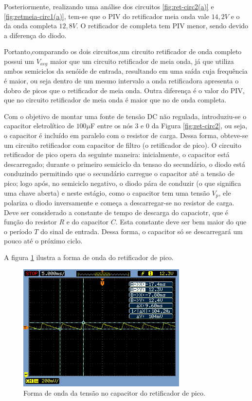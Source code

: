 \documentclass[a4paper]{article} %
\begin{document}
Posteriormente, realizando uma análise dos circuitos  \ref{fig:ret-circ2(a)} e \ref{fig:retmeia-circ1(a)}, tem-se que o PIV do retificador meia onda vale $14,2V$ e o da onda completa $12,8V$. O retificador de completa tem PIV menor, sendo devido a diferença do diodo.


\newpage
Portanto,comparando os dois circuitos,um circuito retificador de onda completo possui um $V_{avg}$ maior que um circuito retificador de meia onda, já que utiliza ambos semiciclos da senóide de entrada, resultando em uma saída cuja frequência é maior, ou seja dentro de um mesmo intervalo a onda retificadora apresenta o dobro de picos que o retificador de meia onda. Outra diferença é o valor do PIV, que no circuito retificador de meia onda é maior que no de onda completa. 


    Com o objetivo de montar uma fonte de tensão DC não regulada, introduziu-se o capacitor eletrolítico de  $100\mu$F entre os nós 3 e 0 da Figura \ref{fig:ret-circ2}, ou seja, o capacitor é incluído em paralelo com o resistor de carga. Dessa forma, obteve-se um circuito retificador com capacitor de filtro (o retificador de pico).
         O circuito retificador de pico opera da seguinte maneira: inicialmente, o capacitor está descarregado; durante o primeiro semiciclo da tensao do secundário, o diodo está conduzindo permitindo que o secundário carregue o capacitor até a tensão de pico; logo após, no semiciclo negativo, o diodo pára de conduzir (o que significa uma chave aberta) e neste estágio, como o capacitor tem uma tensão $V_p$, ele polariza o diodo inversamente e começa a descarregar-se no resistor de carga. Deve ser considerado a constante de tempo de descarga do capaciotr, que é função do resistor $R$ e do capacitor $C$. Esta constante deve ser bem maior do que o período $T$ do sinal de entrada. Dessa forma, o capacitor só se descarregará um pouco até o próximo ciclo.

A figura \ref{fig:cap-ret} ilustra a forma de onda do retificador de pico.

\begin{figure}[h!]
\begin{centering}
\includegraphics[scale=0.7]{Imagens/3.3.4capacitor_paralelo/3cap} \caption{Forma de onda da tensão no capacitor do retificador de pico. \label{fig:cap-ret}}
\par\end{centering}
\end{figure}
\end{document}
